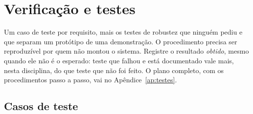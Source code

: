 \chapter{Verificação e testes}
\label{cap:testes}
\rubricaRobustez

\begin{orientacao}
Um caso de teste por requisito, mais os testes de robustez que ninguém
pediu e que separam um protótipo de uma demonstração. O procedimento
precisa ser reproduzível por quem não montou o sistema. Registre o
resultado \emph{obtido}, mesmo quando ele não é o esperado: teste que
falhou e está documentado vale mais, nesta disciplina, do que teste que
não foi feito. O plano completo, com os procedimentos passo a passo,
vai no Apêndice~\ref{ap:testes}.
\end{orientacao}

\section{Casos de teste}

